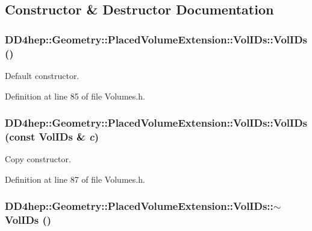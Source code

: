 \subsection{Constructor \& Destructor Documentation}
\hypertarget{class_d_d4hep_1_1_geometry_1_1_placed_volume_extension_1_1_vol_i_ds_a83ca12f7cd6c231504251ce741295f64}{
\subsubsection[{VolIDs}]{\setlength{\rightskip}{0pt plus 5cm}DD4hep::Geometry::PlacedVolumeExtension::VolIDs::VolIDs ()}}
\label{class_d_d4hep_1_1_geometry_1_1_placed_volume_extension_1_1_vol_i_ds_a83ca12f7cd6c231504251ce741295f64}


Default constructor. 

Definition at line 85 of file Volumes.h.\hypertarget{class_d_d4hep_1_1_geometry_1_1_placed_volume_extension_1_1_vol_i_ds_af8871280ae9f0c0381490086de225316}{
\subsubsection[{VolIDs}]{\setlength{\rightskip}{0pt plus 5cm}DD4hep::Geometry::PlacedVolumeExtension::VolIDs::VolIDs (const {\bf VolIDs} \& {\em c})}}
\label{class_d_d4hep_1_1_geometry_1_1_placed_volume_extension_1_1_vol_i_ds_af8871280ae9f0c0381490086de225316}


Copy constructor. 

Definition at line 87 of file Volumes.h.\hypertarget{class_d_d4hep_1_1_geometry_1_1_placed_volume_extension_1_1_vol_i_ds_ab42d6bd0b015ff8dec78a37c29b0a994}{
\subsubsection[{$\sim$VolIDs}]{\setlength{\rightskip}{0pt plus 5cm}DD4hep::Geometry::PlacedVolumeExtension::VolIDs::$\sim$VolIDs ()}}
\label{class_d_d4hep_1_1_geometry_1_1_placed_volume_extension_1_1_vol_i_ds_ab42d6bd0b015ff8dec78a37c29b0a994}


